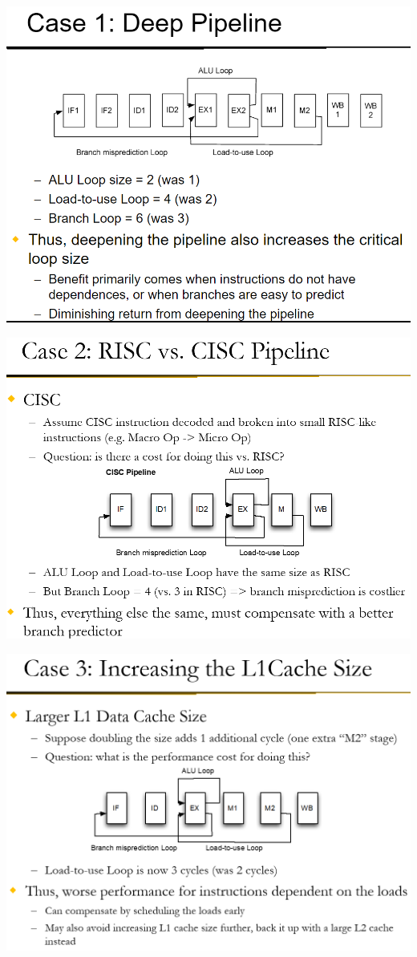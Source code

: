 \documentclass[12pt]{extarticle}
\begin{document}
	\begin{center}
		\includegraphics[scale=0.5]{assets/loop-analysis-ex2.png}
	\end{center}

	\begin{center}
		\includegraphics[scale=0.5]{assets/loop-analysis-ex3.png}
	\end{center}

	\begin{center}
		\includegraphics[scale=0.5]{assets/loop-analysis-ex4.png}
	\end{center}
\end{document}
